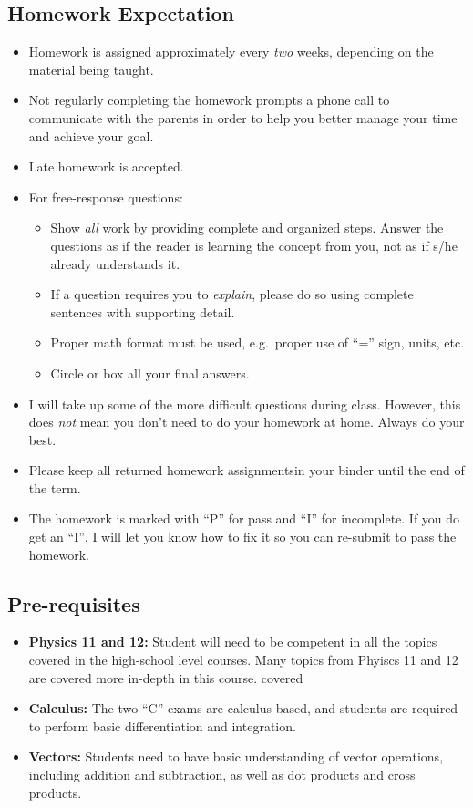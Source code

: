 \documentclass[11pt]{article}
\begin{document}
\subsection{Homework Expectation}

\begin{itemize}[itemsep=0pt,leftmargin=12pt]
\item Homework is assigned approximately every \emph{two} weeks, depending on
  the material being taught.
\item Not regularly completing the homework prompts a phone call to communicate
  with the parents in order to help you better manage your time and achieve
  your goal.
\item Late homework is accepted. 
\item For free-response questions:
  \begin{itemize}[noitemsep]
  \item Show \emph{all} work by providing complete and organized steps. Answer
    the questions as if the reader is learning the concept from you, not as if
    s/he already understands it.
  \item If a question requires you to \emph{explain}, please do so using
    complete sentences with supporting detail.
  \item Proper math format must be used, e.g.\ proper use of ``='' sign, units,
    etc.
  \item Circle or box all your final answers.
  \end{itemize}
\item I will take up some of the more difficult questions during class.
  However, this does \emph{not} mean you don't need to do your homework at
  home. Always do your best.
\item Please keep all returned homework assignmentsin your binder until the end
  of the term.
\item The homework is marked with ``P'' for pass and ``I'' for incomplete. If
  you do get an ``I'', I will let you know how to fix it so you can re-submit
  to pass the homework. 
\end{itemize}


\subsection*{Pre-requisites}
  \begin{itemize}[itemsep=0pt,leftmargin=12pt]
  \item\textbf{Physics 11 and 12:} Student will need to be competent in all the
    topics covered in the high-school level courses. Many topics from Phyiscs
    11 and 12 are covered more in-depth in this course.
    covered
  \item\textbf{Calculus:} The two ``C'' exams are calculus based, and students
    are required to perform basic differentiation and integration.
  \item\textbf{Vectors:} Students need to have basic understanding of vector
    operations, including addition and subtraction, as well as dot products and
    cross products.
  \end{itemize}
\end{document}
